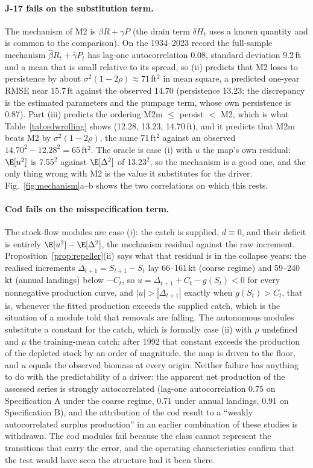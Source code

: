 \paragraph{J-17 fails on the substitution term.} The mechanism of M2 is $\beta R+\gamma P$ (the drain term $\delta H_t$ uses a known quantity and is common to the comparison). On the 1934--2023 record the full-sample mechanism $\hat\beta R_t+\hat\gamma P_t$ has lag-one autocorrelation 0.08, standard deviation 9.2\,ft and a mean that is small relative to its spread, so (ii) predicts that M2 loses to persistence by about $\sigma^2(1-2\rho)\approx 71$\,ft$^2$ in mean square, a predicted one-year RMSE near 15.7\,ft against the observed 14.70 (persistence 13.23; the discrepancy is the estimated parameters and the pumpage term, whose own persistence is 0.87). Part (iii) predicts the ordering M2m $\le$ persist $<$ M2, which is what Table~\ref{tab:edwrolling} shows (12.28, 13.23, 14.70\,ft), and it predicts that M2m beats M2 by $\sigma^2(1-2\rho)$, the same 71\,ft$^2$ against an observed $14.70^2-12.28^2=65$\,ft$^2$. The oracle is case (i) with $u$ the map's own residual: $\E[u^2]$ is 7.55$^2$ against $\E[\Delta^2]$ of 13.23$^2$, so the mechanism is a good one, and the only thing wrong with M2 is the value it substitutes for the driver. Fig.~\ref{fig:mechanism}a--b shows the two correlations on which this rests.

\paragraph{Cod fails on the misspecification term.} The stock-flow modules are case (i): the catch is supplied, $d\equiv0$, and their deficit is entirely $\E[u^2]-\E[\Delta^2]$, the mechanism residual against the raw increment. Proposition~\ref{prop:repeller}(ii) says what that residual is in the collapse years: the realised increments $\Delta_{t+1}=S_{t+1}-S_t$ lay 66--161\,kt (coarse regime) and 59--240\,kt (annual landings) below $-C_t$, so $u=\Delta_{t+1}+C_t-g(S_t)<0$ for every nonnegative production curve, and $|u|>|\Delta_{t+1}|$ exactly when $g(S_t)>C_t$, that is, whenever the fitted production exceeds the supplied catch, which is the situation of a module told that removals are falling. The autonomous modules substitute a constant for the catch, which is formally case (ii) with $\rho$ undefined and $\mu$ the training-mean catch; after 1992 that constant exceeds the production of the depleted stock by an order of magnitude, the map is driven to the floor, and $u$ equals the observed biomass at every origin. Neither failure has anything to do with the predictability of a driver: the apparent net production of the assessed series is strongly autocorrelated (lag-one autocorrelation 0.75 on Specification A under the coarse regime, 0.71 under annual landings, 0.91 on Specification B), and the attribution of the cod result to a ``weakly autocorrelated surplus production'' in an earlier combination of these studies is withdrawn. The cod modules fail because the class cannot represent the transitions that carry the error, and the operating characteristics confirm that the test would have seen the structure had it been there.

